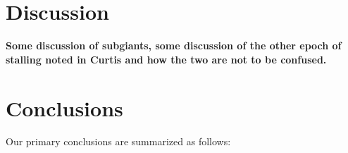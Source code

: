 \documentclass[twocolumn]{aastex631}
\begin{document}

 
\section{Discussion} \label{sec:discussion}
\textbf{Some discussion of subgiants, some discussion of the other epoch of stalling noted in Curtis and how the two are not to be confused.}

\section{Conclusions} \label{sec:conclusions}

Our primary conclusions are summarized as follows:
\end{document}
